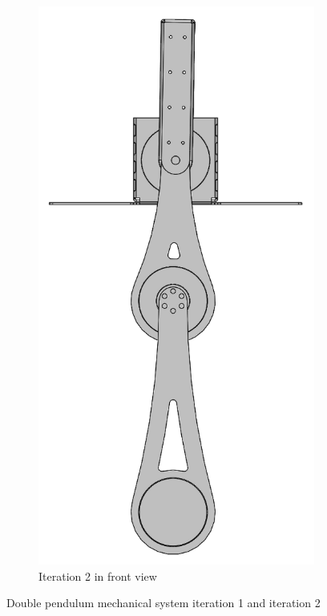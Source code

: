 \begin{figure}[H]
\begin{subfigure}[b]{0.3\textwidth}
        \label{fig:image3}
    \end{subfigure}
    \hfill
    \begin{subfigure}[b]{0.3\textwidth}
        \includegraphics[width=\textwidth]{figures/hardware_setup/double_pendulum_it2_v2.png}
        \caption{Iteration 2 in front view}
        \label{fig:image4}
    \end{subfigure}
    \caption{Double pendulum mechanical system iteration 1 and iteration 2}
    \label{fig:four_images}
\end{figure}

